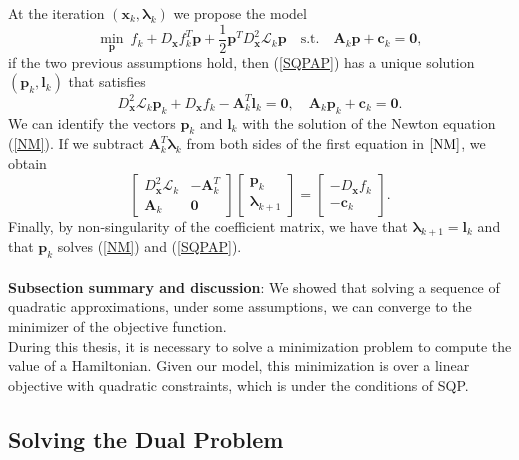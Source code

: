 At the iteration $(\bm{x}_k,\bm{\lambda}_k)$ we propose the model
\begin{equation}
\min_{\bm{p}}\ f_k+D_{\bm{x}} f_k^T\bm{p}+\frac{1}{2}\bm{p}^T D_{\bm{x}}^2\mathcal{L}_k\bm{p}\quad\text{s.t.}\quad\bm{A}_k\bm{p}+\bm{c}_k=\bm{0},
\label{SQPAP}
\end{equation}
if the two previous assumptions hold, then (\ref{SQPAP}) has a unique solution $(\bm{p}_k,\bm{l}_k)$ that satisfies
\begin{equation}
D^2_{\bm{x}}\mathcal{L}_k\bm{p}_k+D_{\bm{x}}f_k-\bm{A}^T_k\bm{l}_k=\bm{0},\quad\bm{A}_k\bm{p}_k+\bm{c}_k=\bm{0}.
\end{equation}
We can identify the vectors $\bm{p}_k$ and $\bm{l}_k$ with the solution of the Newton equation (\ref{NM}). If we subtract $\bm{A}^T_k\bm{\lambda}_k$ from both sides of the first equation in $\ref{NM}$, we obtain
\begin{equation}
\begin{bmatrix}
D^2_{\bm{x}}\mathcal{L}_k & -\bm{A}^T_k\\
\bm{A}_k & \bm{0}
\end{bmatrix}\begin{bmatrix}
\bm{p}_{k}\\
\bm{\lambda}_{k+1}
\end{bmatrix}=\begin{bmatrix}
-D_{\bm{x}} f_k\\
-\bm{c}_k
\end{bmatrix}.
\end{equation}
Finally, by non-singularity of the coefficient matrix, we have that $\bm{\lambda}_{k+1}=\bm{l}_k$ and that $\bm{p}_k$ solves (\ref{NM}) and (\ref{SQPAP}).\\
\\

\textbf{Subsection summary and discussion}: We showed that solving a sequence of quadratic approximations, under some assumptions, we can converge to the minimizer of the objective function.\\
During this thesis, it is necessary to solve a minimization problem to compute the value of a Hamiltonian. Given our model, this minimization is over a linear objective with quadratic constraints, which is under the conditions of SQP.

\subsection{Solving the Dual Problem}

